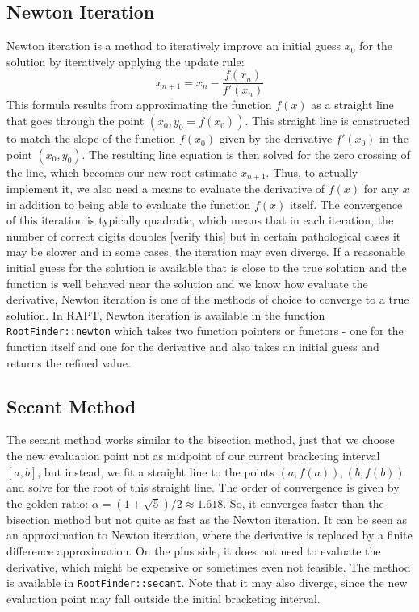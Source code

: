 \subsection{Newton Iteration}
Newton iteration is a method to iteratively improve an initial guess $x_0$ for the solution by iteratively applying the update rule:
\begin{equation}
	x_{n+1} = x_n - \frac{f(x_n)}{f'(x_n)}
\end{equation}
This formula results from approximating the function $f(x)$ as a straight line that goes through the point $(x_0, y_0=f(x_0))$. This straight line is constructed to match the slope of the function $f(x_0)$ given by the derivative $f'(x_0)$ in the point $(x_0, y_0)$. The resulting line equation is then solved for the zero crossing of the line, which becomes our new root estimate $x_{n+1}$. Thus, to actually implement it, we also need a means to evaluate the derivative of $f(x)$ for any $x$ in addition to being able to evaluate the function $f(x)$ itself. The convergence of this iteration is typically quadratic, which means that in each iteration, the number of correct digits doubles [verify this] but in certain pathological cases it may be slower and in some cases, the iteration may even diverge. If a reasonable initial guess for the solution is available that is close to the true solution and the function is well behaved near the solution and we know how evaluate the derivative, Newton iteration is one of the methods of choice to converge to a true solution. In RAPT, Newton iteration is available in the function \texttt{RootFinder::newton} which takes two function pointers or functors - one for the function itself and one for the derivative and also takes an initial guess and returns the refined value.

\subsection{Secant Method}
The secant method works similar to the bisection method, just that we choose the new evaluation point not as midpoint of our current bracketing interval $[a, b]$, but instead, we fit a straight line to the points $(a, f(a)), (b, f(b))$ and solve for the root of this straight line. The order of convergence is given by the golden ratio: $\alpha = (1+\sqrt{5})/2 \approx 1.618$. So, it converges faster than the bisection method but not quite as fast as the Newton iteration. It can be seen as an approximation to Newton iteration, where the derivative is replaced by a finite difference approximation. On the plus side, it does not need to evaluate the derivative, which might be expensive or sometimes even not feasible. The method is available in \texttt{RootFinder::secant}. Note that it may also diverge, since the new evaluation point may fall outside the initial bracketing interval.

